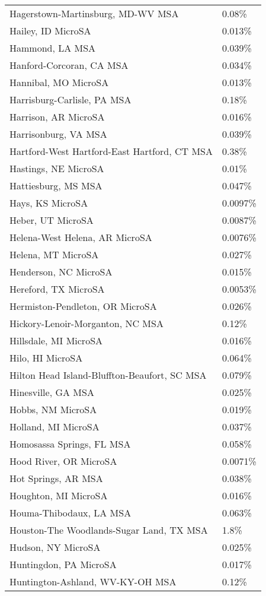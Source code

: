 \begin{longtable}[]{@{}ll@{}}
Hagerstown-Martinsburg, MD-WV MSA & 0.08\% \\
Hailey, ID MicroSA & 0.013\% \\
Hammond, LA MSA & 0.039\% \\
Hanford-Corcoran, CA MSA & 0.034\% \\
Hannibal, MO MicroSA & 0.013\% \\
Harrisburg-Carlisle, PA MSA & 0.18\% \\
Harrison, AR MicroSA & 0.016\% \\
Harrisonburg, VA MSA & 0.039\% \\
Hartford-West Hartford-East Hartford, CT MSA & 0.38\% \\
Hastings, NE MicroSA & 0.01\% \\
Hattiesburg, MS MSA & 0.047\% \\
Hays, KS MicroSA & 0.0097\% \\
Heber, UT MicroSA & 0.0087\% \\
Helena-West Helena, AR MicroSA & 0.0076\% \\
Helena, MT MicroSA & 0.027\% \\
Henderson, NC MicroSA & 0.015\% \\
Hereford, TX MicroSA & 0.0053\% \\
Hermiston-Pendleton, OR MicroSA & 0.026\% \\
Hickory-Lenoir-Morganton, NC MSA & 0.12\% \\
Hillsdale, MI MicroSA & 0.016\% \\
Hilo, HI MicroSA & 0.064\% \\
Hilton Head Island-Bluffton-Beaufort, SC MSA & 0.079\% \\
Hinesville, GA MSA & 0.025\% \\
Hobbs, NM MicroSA & 0.019\% \\
Holland, MI MicroSA & 0.037\% \\
Homosassa Springs, FL MSA & 0.058\% \\
Hood River, OR MicroSA & 0.0071\% \\
Hot Springs, AR MSA & 0.038\% \\
Houghton, MI MicroSA & 0.016\% \\
Houma-Thibodaux, LA MSA & 0.063\% \\
Houston-The Woodlands-Sugar Land, TX MSA & 1.8\% \\
Hudson, NY MicroSA & 0.025\% \\
Huntingdon, PA MicroSA & 0.017\% \\
Huntington-Ashland, WV-KY-OH MSA & 0.12\% \\

\end{longtable}
